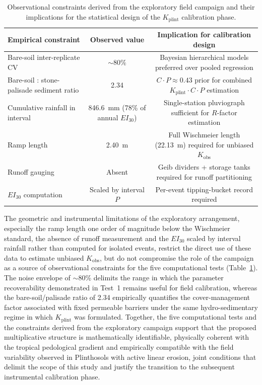 \documentclass[preprint,review,12pt,authoryear]{elsarticle}
\begin{document}
\begin{table}[htbp]
\centering
\caption{Observational constraints derived from the exploratory field campaign and their implications for the statistical design of the $K_{\mathrm{plint}}$ calibration phase.}
\label{tab:comparativa}
\small
\begin{tabular}{@{}l c c@{}}
\toprule
Empirical constraint & Observed value & Implication for calibration design \\
\midrule
Bare-soil inter-replicate CV & $\sim$80\% & Bayesian hierarchical models preferred over pooled regression \\
Bare-soil : stone-palisade sediment ratio & 2.34 & $C \cdot P \approx 0.43$ prior for combined $K_{\mathrm{plint}} \cdot C \cdot P$ estimation \\
Cumulative rainfall in interval & 846.6~mm (78\% of annual $EI_{30}$) & Single-station pluviograph sufficient for $R$-factor estimation \\
Ramp length & 2.40~m & Full Wischmeier length (22.13~m) required for unbiased $K_{\mathrm{obs}}$ \\
Runoff gauging & Absent & Geib dividers + storage tanks required for runoff partitioning \\
$EI_{30}$ computation & Scaled by interval $P$ & Per-event tipping-bucket record required \\
\bottomrule
\end{tabular}
\end{table}

The geometric and instrumental limitations of the exploratory arrangement, especially the ramp length one order of magnitude below the Wischmeier standard, the absence of runoff measurement and the $EI_{30}$ scaled by interval rainfall rather than computed for isolated events, restrict the direct use of these data to estimate unbiased $K_{\mathrm{obs}}$, but do not compromise the role of the campaign as a source of observational constraints for the five computational tests (Table~\ref{tab:comparativa}). The noise envelope of $\sim$80\% delimits the range in which the parameter recoverability demonstrated in Test~1 remains useful for field calibration, whereas the bare-soil/palisade ratio of 2.34 empirically quantifies the cover-management factor associated with fixed permeable barriers under the same hydro-sedimentary regime in which $K_{\mathrm{plint}}$ was formulated. Together, the five computational tests and the constraints derived from the exploratory campaign support that the proposed multiplicative structure is mathematically identifiable, physically coherent with the tropical pedological gradient and empirically compatible with the field variability observed in Plinthosols with active linear erosion, joint conditions that delimit the scope of this study and justify the transition to the subsequent instrumental calibration phase.
\end{document}
